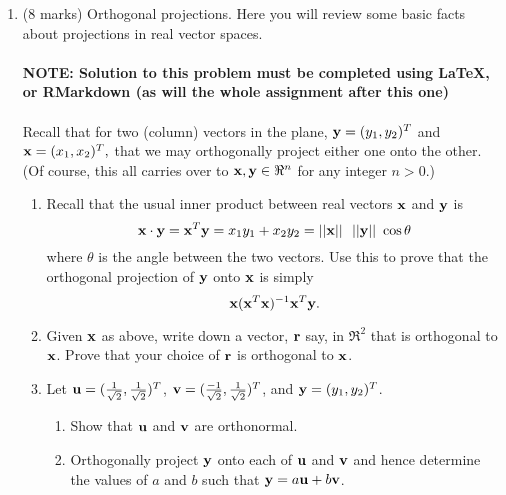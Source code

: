 \documentclass[12]{article}
\begin{document}
\begin{enumerate}
\newpage
\item (8 marks) { Orthogonal projections}.  Here you will review some basic facts about projections in real vector spaces.\\
\vspace{0.01\textheight}\\
{\bf NOTE:  Solution to this problem must be completed using LaTeX, or RMarkdown (as will the whole assignment after this one)}\\
\vspace{0.01\textheight}\\
 Recall that for two (column) vectors in the plane, ${\bf y} = (y_1, y_2)^T$ and ${\bf x} = (x_1, x_2)^T,$ that we may orthogonally project either one onto the other. 
(Of course, this all carries over to ${\bf x}, {\bf y} \in \Re^n$ for any integer $n > 0$.)
\begin{enumerate}
\item Recall that the usual inner product between real vectors ${\bf x} $ and ${\bf y} $ is 
\[{\bf x} \cdot {\bf y} = {\bf x}^T{\bf y} = x_1y_1 + x_2y_2 = ||{\bf x}|| ~~ ||{\bf y}|| ~\cos \theta
\]
where $\theta$ is the angle between the two vectors.  Use this to prove that the orthogonal projection
of ${\bf y}$ onto ${\bf x}$ is simply 
\[ {\bf x}({\bf x}^T{\bf x})^{-1}{\bf x}^T {\bf y}.\]
\item Given  ${\bf x}$ as above, write down a vector, ${\bf r}$ say, in $\Re^2$ that is orthogonal to ${\bf x}$.  Prove that your choice of ${\bf r}$ is orthogonal to ${\bf x}$.
      \item Let ${\bf u}=(\frac{1}{\sqrt{2}},\frac{1}{\sqrt{2}})^T$, ${\bf v}=(\frac{-1}{\sqrt{2}},\frac{1}{\sqrt{2}})^T$,  and ${\bf y}=(y_1, y_2)^T$. 
      \begin{enumerate}
\item Show that ${\bf u}$ and ${\bf v}$ are orthonormal.
\item  Orthogonally project ${\bf y}$ onto each of ${\bf u}$ and ${\bf v}$ and hence determine the values of $a$ and $b$ such that 
      ${\bf y} = a {\bf u} + b {\bf v}$.

\end{enumerate}
  
\end{enumerate}
\end{enumerate}
\end{document}
